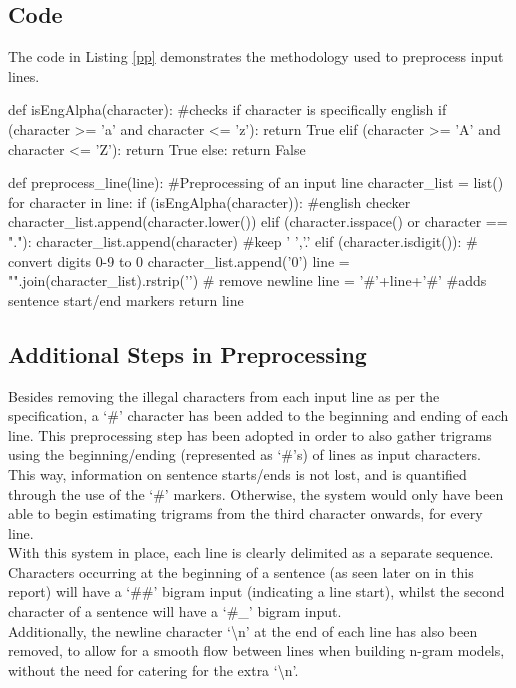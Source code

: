 \documentclass[12pt]{article}
\begin{document}
\subsection{Code}
The code in Listing \ref{pp} demonstrates the methodology used to preprocess input lines.
\begin{python}[caption = {Line Preprocessing},label = {pp}]
def isEngAlpha(character):
#checks if character is specifically english
	if (character >= 'a' and character <= 'z'):
		return True
	elif (character >= 'A' and character <= 'Z'):
		return True
	else:
		return False

def preprocess_line(line):
#Preprocessing of an input line
	character_list = list()
	for character in line:
		if (isEngAlpha(character)): #english checker
			character_list.append(character.lower()) 
		elif (character.isspace() or character == "."): 
			character_list.append(character) #keep ' ','.'
		elif (character.isdigit()):
			# convert digits {0-9} to 0
			character_list.append('0') 
	line = "".join(character_list).rstrip('\n') # remove newline  
	line = '#'+line+'#' #adds sentence start/end markers
	return line
\end{python}
\subsection{Additional Steps in Preprocessing}
Besides removing the illegal characters from each input line as per the specification, a `\#' character has been added to the beginning and ending of each line. This preprocessing step has been adopted in order to also gather trigrams using the beginning/ending (represented as `\#'s) of lines as input characters.  This way, information on sentence starts/ends is not lost, and is quantified through the use of the `\#' markers.  Otherwise, the system would only have been able to begin estimating trigrams from the third character onwards, for every line.  \\
\hfill\break
With this system in place, each line is clearly delimited as a separate sequence.  Characters occurring at the beginning of a sentence (as seen later on in this report) will have a `\#\#' bigram input (indicating a line start), whilst the second character of a sentence will have a `\#\_' bigram input. \\
\hfill\break
Additionally, the newline character `\textbackslash n' at the end of each line has also been removed, to allow for a smooth flow between lines when building n-gram models, without the need for catering for the extra `\textbackslash n'.
\end{document}
